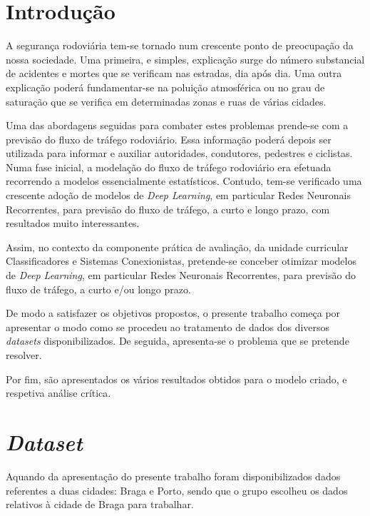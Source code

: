 \documentclass[a4paper, 12pt]{article}
\begin{document}
\newpage
\newpage
\tableofcontents
\thispagestyle{empty}

\newpage
{}

\section{Introdução}

A segurança rodoviária tem-se tornado num crescente ponto de preocupação da nossa sociedade. Uma primeira, e simples, explicação surge do número substancial de acidentes e mortes que se verificam nas estradas, dia após dia. Uma outra explicação poderá fundamentar-se na poluição atmosférica ou no grau de saturação que se verifica em determinadas zonas e ruas de várias cidades.

Uma das abordagens seguidas para combater estes problemas prende-se com a previsão do fluxo de tráfego rodoviário. Essa informação poderá depois ser utilizada para informar e auxiliar autoridades, condutores, pedestres e ciclistas. Numa fase inicial, a modelação do fluxo de tráfego rodoviário era efetuada recorrendo a modelos essencialmente estatísticos. Contudo, tem-se verificado uma crescente adoção de modelos de \textit{Deep Learning}, em particular Redes Neuronais Recorrentes, para previsão do fluxo de tráfego, a curto e longo prazo, com resultados muito interessantes.

Assim, no contexto da componente prática de avaliação, da unidade curricular Classificadores e Sistemas Conexionistas, pretende-se conceber otimizar modelos de \textit{Deep Learning}, em particular Redes Neuronais Recorrentes, para previsão do fluxo de tráfego, a curto e/ou longo prazo. 

De modo a satisfazer os objetivos propostos, o presente trabalho começa por apresentar o modo como se procedeu ao tratamento de dados dos diversos \textit{datasets} disponibilizados. De seguida, apresenta-se o problema que se pretende resolver.

Por fim, são apresentados os vários resultados obtidos para o modelo criado, e respetiva análise crítica.

\newpage

\section{\textit{Dataset}}

Aquando da apresentação do presente trabalho foram disponibilizados dados referentes a duas cidades: Braga e Porto, sendo que o grupo escolheu os dados relativos à cidade de Braga para trabalhar.
\end{document}
